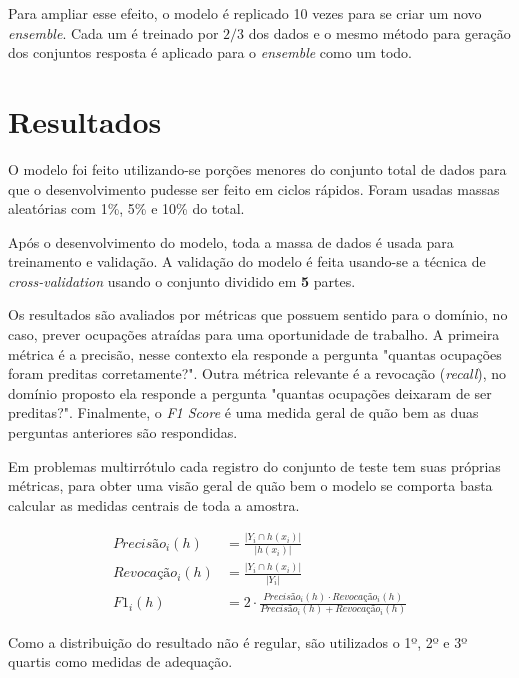 \documentclass[runningheads,a4paper]{llncs}
\begin{document}
Para ampliar esse efeito, o modelo é replicado 10 vezes para se criar um novo \textit{ensemble}. Cada um é treinado por $2/3$ dos dados e o mesmo método para geração dos conjuntos resposta é aplicado para o \textit{ensemble} como um todo.

\section{Resultados} \label{sec:resultados}

O modelo foi feito utilizando-se porções menores do conjunto total de dados para que o desenvolvimento pudesse ser feito em ciclos rápidos. Foram usadas massas aleatórias com 1\%, 5\% e 10\% do total.

Após o desenvolvimento do modelo, toda a massa de dados é usada para treinamento e validação. A validação do modelo é feita usando-se a técnica de \textit{cross-validation} \cite{Kohavi95-as} usando o conjunto dividido em \textbf{5} partes.

Os resultados são avaliados por métricas que possuem sentido para o domínio, no caso, prever ocupações atraídas para uma oportunidade de trabalho. A primeira métrica é a precisão, nesse contexto ela responde a pergunta "quantas ocupações foram preditas corretamente?". Outra métrica relevante é a revocação (\textit{recall}), no domínio proposto ela responde a pergunta "quantas ocupações deixaram de ser preditas?". Finalmente, o \textit{F1 Score} é uma medida geral de quão bem as duas perguntas anteriores são respondidas.

Em problemas multirrótulo cada registro do conjunto de teste tem suas próprias métricas, para obter uma visão geral de quão bem o modelo se comporta basta calcular as medidas centrais de toda a amostra.

\begin{align*}
Precisão_i(h) &= \frac{|Y_i \cap h(x_i)|}{|h(x_i)|} \\
Revocação_i(h) &= \frac{|Y_i \cap h(x_i)|}{|Y_i|} \\
F1_i(h) &= 2 \cdot \frac{Precisão_i(h) \cdot Revocação_i(h)}{Precisão_i(h) + Revocação_i(h)} 
\end{align*}

Como a distribuição do resultado não é regular, são utilizados o 1º, 2º e 3º quartis como medidas de adequação.
\end{document}
